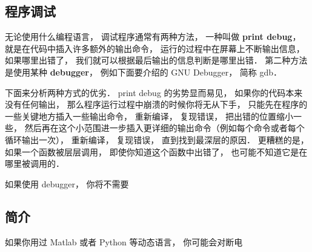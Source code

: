 
\subsection{程序调试}
无论使用什么编程语言， 调试程序通常有两种方法， 一种叫做 \textbf{print debug}， 就是在代码中插入许多额外的输出命令， 运行的过程中在屏幕上不断输出信息， 如果哪里出错了， 我们就可以根据最后输出的信息判断是哪里出错． 第二种方法是使用某种 \textbf{debugger}， 例如下面要介绍的 GNU Debugger， 简称 gdb．

下面来分析两种方式的优劣． print debug 的劣势显而易见， 如果你的代码本来没有任何输出， 那么程序运行过程中崩溃的时候你将无从下手， 只能先在程序的一些关键地方插入一些输出命令， 重新编译， 复现错误， 把出错的位置缩小一些， 然后再在这个小范围进一步插入更详细的输出命令（例如每个命令或者每个循环输出一次）， 重新编译， 复现错误， 直到找到最深层的原因． 更糟糕的是， 如果一个函数被层层调用， 即使你知道这个函数中出错了， 也可能不知道它是在哪里被调用的．

如果使用 debugger， 你将不需要

\subsection{简介}
如果你用过 Matlab 或者 Python 等动态语言， 你可能会对断电
